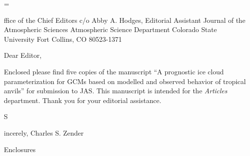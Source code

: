 

\magnification=

\addressdefine
\formalletterhead

\address
Office of the Chief Editors
c/o Abby A. Hodges, Editorial Assistant
Journal of the Atmospheric Sciences
Atmospheric Science Department
Colorado State University
Fort Collins, CO 80523-1371

\body
Dear Editor,

Enclosed please find five copies of the manuscript ``A prognostic ice
cloud parameterization for {GCM}s based on modelled and observed
behavior of tropical anvils'' for submission to JAS. 
This manuscript is intended for the {\it Articles} department.
Thank you for your editorial assistance.

\closing 
Sincerely,
Charles S. Zender

\annotations %
Enclosures


\endletter %
\bye %

